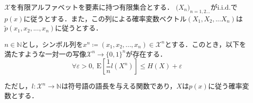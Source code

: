 \documentclass{classes/myclass}
\begin{document}
\begin{thm}
$\mathcal{X}$を有限アルファベットを要素に持つ有限集合とする．
$\lparen X_n \rparen_{n = 1, 2...}$が$\mathrm{i.i.d.}$で$p(x)$に従うとする．また，この列による確率変数ベクトル$(X_1, X_2, ... X_n)$は$\tilde{p}(x_1, x_2, ..., x_n)$に従うとする．

$n \in \mathbb{N}$とし，シンボル列を$x^n \coloneq (x_1, x_2,..., x_n) \in \mathcal{X}^n$とする．このとき，以下を満たすような一対一の写像$\mathcal{X}^n \rightarrow \lbrace 0, 1 \rbrace^n$が存在する．
\[
  \forall \varepsilon > 0, \ \mathrm{E}\left \lbrack \frac{1}{n} l(X^n) \right \rbrack \leq H(X) + \varepsilon
\]

ただし，$l: \mathcal{X}^n \rightarrow \mathbb{N}$は符号語の語長を与える関数であり，$X$は$p(x)$に従う確率変数とする．

\end{thm}
\end{document}
